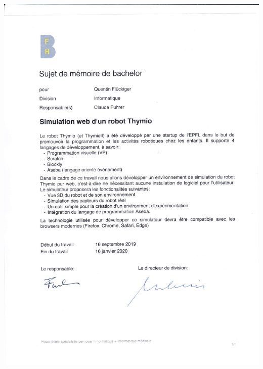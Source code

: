\documentclass{scrbook}
\begin{document}
\includegraphics[width=\textwidth]{pdf/bachelor_quentin.pdf}

\printbibliography[heading=bibintoc]
\end{document}

